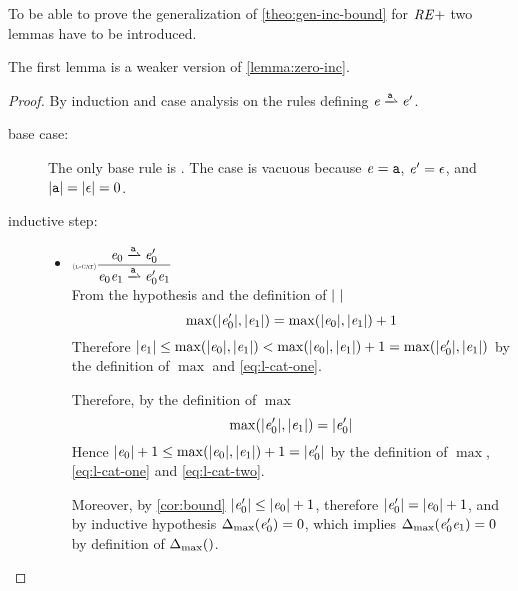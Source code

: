 To be able to prove the generalization of \cref{theo:gen-inc-bound} for $\mathit {RE+}$ two lemmas have to be introduced.

The first lemma is a weaker version of \cref{lemma:zero-inc}.

\begin{proof}
 By induction and case analysis on the rules defining $\re\parDer{\sym}\re'$.
 \begin{description}
  \item[base case:] The only base rule is .
   The case is vacuous because $\mathit {e}=\mathtt {a}$, $\mathit {e}'=\mathtt {\epsilon}$, and ${\mid}{\mathtt {a}}{\mid}={\mid}{\mathtt {\epsilon}}{\mid}=0$.
  \item[inductive step:] \hspace*{\fill}
   \begin{itemize}
    \item $\Rule{l-cat}{\re_0\parDer{\sym}\re'_0}{\re_0\catop\re_1\parDer{\sym}\re'_0\catop\re_1}{}$\\[2ex]
          From the hypothesis and the definition of ${\mid}{\ }{\mid}$
          \begin{equation}
           \label{eq:l-cat-one}
           \max({\mid}{\mathit {e}_0'}{\mid},{\mid}{\mathit {e}_1}{\mid})=\max({\mid}{\mathit {e}_0}{\mid},{\mid}{\mathit {e}_1}{\mid})+1
          \end{equation}
          Therefore ${\mid}{\mathit {e}_1}{\mid}\leq\max({\mid}{\mathit {e}_0}{\mid},{\mid}{\mathit {e}_1}{\mid})<\max({\mid}{\mathit {e}_0}{\mid},{\mid}{\mathit {e}_1}{\mid})+1=\max({\mid}{\mathit {e}_0'}{\mid},{\mid}{\mathit {e}_1}{\mid})$ by the definition of $\max$ and \cref{eq:l-cat-one}.

          Therefore, by the definition of $\max$
          \begin{equation}
           \label{eq:l-cat-two}
           \max({\mid}{\mathit {e}_0'}{\mid},{\mid}{\mathit {e}_1}{\mid})={\mid}{\mathit {e}_0'}{\mid}
          \end{equation}
          Hence ${\mid}{\mathit {e}_0}{\mid}+1\leq\max({\mid}{\mathit {e}_0}{\mid},{\mid}{\mathit {e}_1}{\mid})+1={\mid}{\mathit {e}'_0}{\mid}$ by the definition of $\max$, \cref{eq:l-cat-one} and \cref{eq:l-cat-two}.

          Moreover, by \cref{cor:bound} ${\mid}{\mathit {e}_0'}{\mid}\leq{\mid}{\ensuremath{\mathit {e}}_0}{\mid}+1$, therefore
          ${\mid}{\mathit {e}_0'}{\mid}={\mid}{\mathit {e}_0}{\mid}+1$, and by inductive hypothesis ${\Delta_{\max}}({\mathit {e}'_0})=0$, which implies ${\Delta_{\max}}({\mathit {e}'_0\mathit {e}_1})=0$ by definition of ${\Delta_{\max}}({})$.


\end{itemize}
\end{description}
\end{proof}
